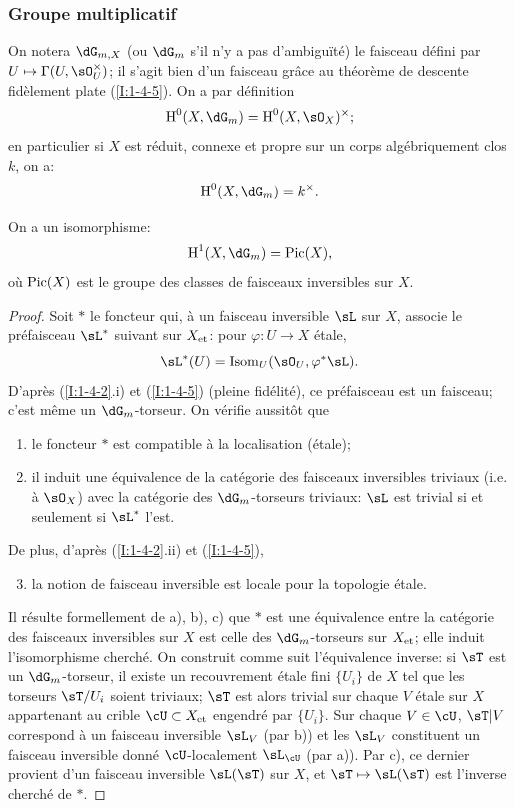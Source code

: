 \subsubsection{Groupe multiplicatif}\label{I:2-2-2}

On notera $\dG_{m,X}$ (ou $\dG_m$ s'il n'y a pas d'ambiguïté) le faisceau 
défini par $U\mapsto \Gamma(U,\sO_U^\times)$; il s'agit bien d'un faisceau 
grâce au théorème de descente fidèlement plate (\ref{I:1-4-5}). On a 
par définition 
\[
  \h^0(X,\dG_m) = \h^0(X,\sO_X)^\times\text{;}
\]
en particulier si $X$ est réduit, connexe et propre sur un corps 
algébriquement clos $k$, on a:
\[
  \h^0(X,\dG_m) = k^\times\text{.}
\]

\begin{proposition}\label{I:2-2-3}
On a un isomorphisme:
\[
  \h^1(X,\dG_m) = \pic(X)\text{,}
\]
où $\operatorname{Pic}(X)$ est le groupe des classes de faisceaux inversibles sur $X$.
\end{proposition}
\begin{proof}
Soit $*$ le foncteur qui, à un faisceau inversible $\sL$ sur $X$, associe le 
préfaisceau $\sL^*$ suivant sur ${X}_{\textnormal{et}}$: pour $\varphi:U\to X$ étale, 
\[
  \sL^*(U)=\operatorname{Isom}_U(\sO_U,\varphi^*\sL)\text{.}
\]
D'après (\ref{I:1-4-2}.i) et (\ref{I:1-4-5}) (pleine fidélité), ce 
préfaisceau est un faisceau; c'est même un $\dG_m$-torseur. On vérifie 
aussitôt que 
\begin{enumerate}[\indent a)]
  \item le foncteur $*$ est compatible à la localisation (étale);
  \item il induit une équivalence de la catégorie des faisceaux 
    inversibles triviaux (i.e. à $\sO_X$) avec la catégorie des 
    $\dG_m$-torseurs triviaux: $\sL$ est trivial si et seulement si $\sL^*$ 
    l'est.
\end{enumerate}

De plus, d'après (\ref{I:1-4-2}.ii) et (\ref{I:1-4-5}), 
\begin{enumerate}[\indent a)]
\setcounter{enumi}{2}
  \item la notion de faisceau inversible est locale pour la topologie étale. 
\end{enumerate}

Il résulte formellement de a), b), c) que $*$ est une équivalence entre la 
catégorie des faisceaux inversibles sur $X$ est celle des $\dG_m$-torseurs 
sur ${X}_{\textnormal{et}}$; elle induit l'isomorphisme cherché. On construit comme suit 
l'équivalence inverse: si $\sT$ est un $\dG_m$-torseur, il existe un 
recouvrement étale fini $\{U_i\}$ de $X$ tel que les torseurs $\sT/U_i$ soient 
triviaux; $\sT$ est alors trivial sur chaque $V$ étale sur $X$ appartenant au 
crible $\cU\subset \et X$ engendré par $\{U_i\}$. Sur chaque 
$V\in\cU$, $\sT|V$ correspond à un faisceau inversible $\sL_V$ (par b)) et les 
$\sL_V$ constituent un faisceau inversible donné $\cU$-localement $\sL_\cU$ 
(par a)). Par c), ce dernier provient d'un faisceau inversible $\sL(\sT)$ sur 
$X$, et $\sT\mapsto \sL(\sT)$ est l'inverse cherché de $*$. 
\end{proof}
